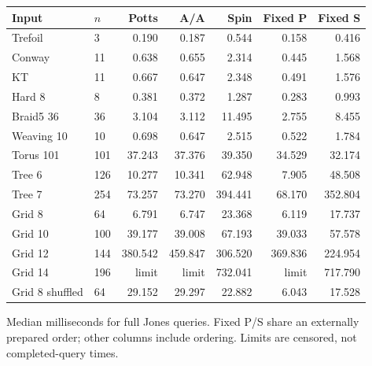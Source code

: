 \begin{center}\small
\begin{tabular}{@{}llrrrrr@{}}
\toprule
Input & $n$ & Potts & A/A & Spin & Fixed P & Fixed S \\
\midrule
Trefoil & 3 & 0.190 & 0.187 & 0.544 & 0.158 & 0.416 \\
Conway & 11 & 0.638 & 0.655 & 2.314 & 0.445 & 1.568 \\
KT & 11 & 0.667 & 0.647 & 2.348 & 0.491 & 1.576 \\
Hard 8 & 8 & 0.381 & 0.372 & 1.287 & 0.283 & 0.993 \\
Braid5 36 & 36 & 3.104 & 3.112 & 11.495 & 2.755 & 8.455 \\
Weaving 10 & 10 & 0.698 & 0.647 & 2.515 & 0.522 & 1.784 \\
Torus 101 & 101 & 37.243 & 37.376 & 39.350 & 34.529 & 32.174 \\
Tree 6 & 126 & 10.277 & 10.341 & 62.948 & 7.905 & 48.508 \\
Tree 7 & 254 & 73.257 & 73.270 & 394.441 & 68.170 & 352.804 \\
Grid 8 & 64 & 6.791 & 6.747 & 23.368 & 6.119 & 17.737 \\
Grid 10 & 100 & 39.177 & 39.008 & 67.193 & 39.033 & 57.578 \\
Grid 12 & 144 & 380.542 & 459.847 & 306.520 & 369.836 & 224.954 \\
Grid 14 & 196 & limit & limit & 732.041 & limit & 717.790 \\
Grid 8 shuffled & 64 & 29.152 & 29.297 & 22.882 & 6.043 & 17.528 \\
\bottomrule
\end{tabular}
\end{center}
Median milliseconds for full Jones queries. Fixed P/S share an externally prepared order; other columns include ordering. Limits are censored, not completed-query times.
